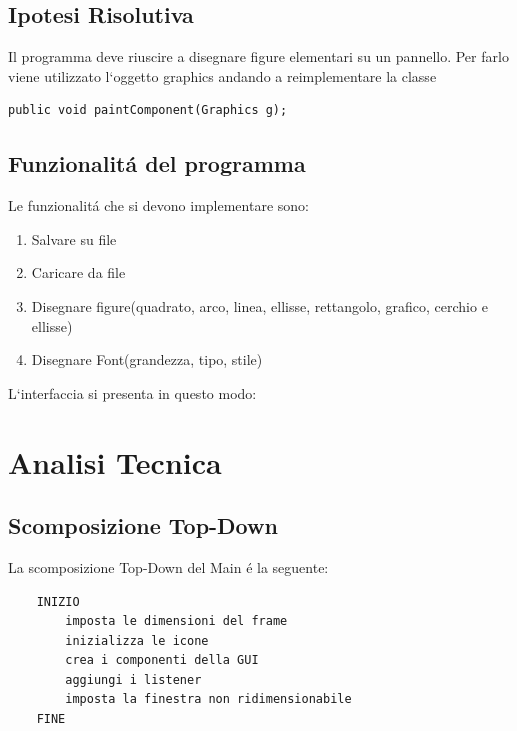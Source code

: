 \documentclass[a4paper,12pt,times,numbered,print,index]{article}
\begin{document}
\subsection{Ipotesi Risolutiva}
Il programma deve riuscire a disegnare figure elementari su un pannello. Per farlo viene utilizzato l`oggetto graphics andando a reimplementare la classe 
\begin{lstlisting}
public void paintComponent(Graphics g);
\end{lstlisting}

\subsection{Funzionalitá del programma}
Le funzionalitá che si devono implementare sono:
\begin{enumerate}
	\item Salvare su file
	\item Caricare da file
	\item Disegnare figure(quadrato, arco, linea, ellisse, rettangolo, grafico, cerchio e ellisse)
	\item Disegnare Font(grandezza, tipo,  stile)
\end{enumerate}


L`interfaccia si presenta in questo modo:


\section{Analisi Tecnica}

\subsection{Scomposizione Top-Down}
La scomposizione Top-Down del Main é la seguente:
\begin{lstlisting}
	INIZIO
		imposta le dimensioni del frame
		inizializza le icone
		crea i componenti della GUI
		aggiungi i listener
		imposta la finestra non ridimensionabile
	FINE
\end{lstlisting}
\end{document}
